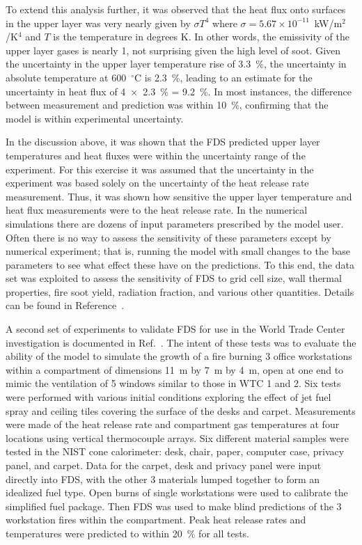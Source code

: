 To extend  this analysis further, it  was observed that  the heat flux onto surfaces in the upper layer was very nearly given by $\sigma T^4$ where
$\sigma=5.67  \times 10^{-11}$~kW/m$^2$/K$^4$  and  $T$ is  the temperature in degrees K. In  other words, the emissivity of the upper layer  gases
is  nearly  1, not  surprising  given the  high level  of soot. Given  the uncertainty  in the upper  layer temperature  rise of 3.3~\%, the
uncertainty in  absolute temperature at  600~$^\circ$C is 2.3~\%, leading  to an  estimate for the  uncertainty in heat  flux of 4~$\times$~2.3~\% =
9.2~\%.  In most instances, the difference between measurement and prediction was within 10~\%, confirming that the model is within experimental
uncertainty.

In the  discussion above,  it was shown  that the FDS  predicted upper layer temperatures  and heat fluxes were within  the uncertainty range of  the
experiment.  For  this  exercise  it  was  assumed  that  the uncertainty in the  experiment was based solely on  the uncertainty of the heat
release rate measurement.  Thus, it was shown  how sensitive the upper  layer temperature  and heat flux  measurements were  to the heat release
rate. In the  numerical simulations there are  dozens of input parameters prescribed by the  model user.  Often there is no way to  assess the
sensitivity of  these parameters  except  by numerical experiment; that is, running the  model with small changes to the base parameters to see  what
effect these have on  the predictions. To this end, the  data set was exploited  to assess the sensitivity  of FDS to grid cell  size, wall thermal
properties, fire soot  yield, radiation fraction,  and  various other  quantities.  Details  can  be found  in Reference~\cite{Hamins:WTC1}.

A second set of experiments to validate FDS for use in the World Trade Center  investigation is  documented  in Ref.~\cite{Hamins:WTC2}.  The intent
of  these tests  was to  evaluate the ability  of the  model to simulate the growth  of a fire burning 3  office workstations within a compartment of
dimensions 11~m by 7~m by 4~m, open at one end to mimic the ventilation  of 5  windows similar to  those in  WTC 1 and  2. Six tests  were performed
with various  initial conditions  exploring the effect of jet fuel spray and ceiling tiles covering the surface of the desks and carpet. Measurements
were  made of the heat release rate and compartment  gas   temperatures  at  four   locations  using  vertical thermocouple arrays. Six different
material samples were tested in the NIST  cone calorimeter:  desk,  chair, paper,  computer case,  privacy panel, and  carpet. Data for the  carpet,
desk and  privacy panel were input directly into FDS, with the other 3 materials lumped together to form an  idealized fuel type.  Open burns of
single  workstations were used to  calibrate the simplified fuel  package. Then FDS  was used to make  blind  predictions  of   the  3  workstation
fires  within  the compartment. Peak  heat release rates and  temperatures were predicted to within 20~\% for all tests.


